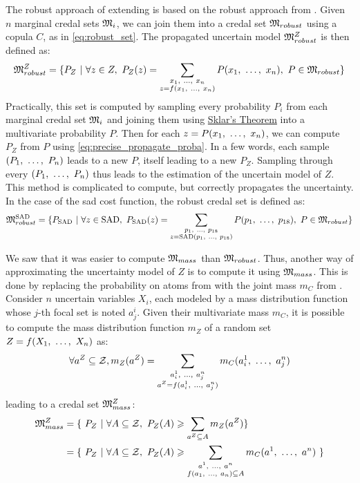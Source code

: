 The robust approach of extending  is based on the robust approach from . Given $n$ marginal credal sets $\mathfrak{M}_i$, we can join them into a credal set $\mathfrak{M}_{robust}$ using a copula $C$, as in \eqref{eq:robust_set}. The propagated uncertain model $\mathfrak{M}^Z_{robust}$ is then defined as:
\begin{align}
    \mathfrak{M}^Z_{robust} = \{P_Z~|~\forall z\in Z, ~P_Z(z)=\sum_{\substack{x_1 , ~\ldots, ~ x_n\\z=f(x_1 , ~\ldots, ~ x_n)}}P(x_1 , ~\ldots, ~ x_n), ~P\in\mathfrak{M}_{robust}\}
\end{align}
Practically, this set is computed by sampling every probability $P_i$ from each marginal credal set $\mathfrak{M}_i$ and joining them using \hyperref[theorem:sklar]{Sklar's Theorem} into a multivariate probability $P$. Then for each $z=P(x_1 , ~\ldots, ~ x_n)$, we can compute $P_Z$ from $P$ using \eqref{eq:precise_propagate_proba}. In a few words, each sample $(P_1 , ~\ldots, ~ P_n)$ leads to a new $P$, itself leading to a new $P_Z$. Sampling through every $(P_1 , ~\ldots, ~ P_n)$ thus leads to the estimation of the uncertain model of $Z$. This method is complicated to compute, but correctly propagates the uncertainty. In the case of the \acrshort{sad} cost function, the robust credal set is defined as:
\begin{align}
    \mathfrak{M}^{\mathrm{SAD}}_{robust} = \{P_{\mathrm{SAD}}~|~\forall z\in \mathrm{SAD}, ~P_{\mathrm{SAD}}(z)=\sum_{\substack{p_1 , ~\ldots, ~ p_{18}\\z=\mathrm{SAD}(p_1 , ~\ldots, ~ p_{18})}}P(p_1 , ~\ldots, ~ p_{18}), ~P\in\mathfrak{M}_{robust}\}
\end{align}

We saw that it was easier to compute $\mathfrak{M}_{mass}$ than $\mathfrak{M}_{robust}$. Thus, another way of approximating the uncertainty model of $Z$ is to compute it using $\mathfrak{M}_{mass}$. This is done by replacing the probability on atoms from  with the joint mass $m_C$ from  \cite{gray_dependent_2021}. Consider $n$ uncertain variables $X_i$, each modeled by a mass distribution function whose $j$-th focal set is noted $a^i_j$. Given their multivariate mass $m_C$, it is possible to compute the mass distribution function $m_Z$ of a random set $Z=f(X_1 , ~\ldots, ~ X_n)$ as:
\begin{align}
    \forall a^Z\subseteq\mathcal{Z}, m_Z(a^Z) = \sum_{\substack{a^1_i , ~\ldots, ~ a^n_j\\a^Z=f(a^1_i , ~\ldots, ~  a^n_j)}}m_C(a^1_i , ~\ldots, ~ a^n_j)\label{eq:mass_propagated}
\end{align}
leading to a credal set $\mathfrak{M}_{mass}^Z$:
\begin{align}
    \mathfrak{M}_{mass}^Z &= \{~P_Z~|~\forall A\subseteq\mathcal{Z},~P_Z(A)\geqslant \sum_{a^Z\subseteq A}m_Z(a^Z)\}\\
    &=\{~P_Z~|~\forall A\subseteq\mathcal{Z},~P_Z(A)\geqslant \sum_{\substack{a^1, ~\ldots, ~ a^n \\ f(a_1, ~\ldots, ~ a_n)\subseteq A}}m_C(a^1, ~\ldots, ~ a^n)~\}
\end{align}

